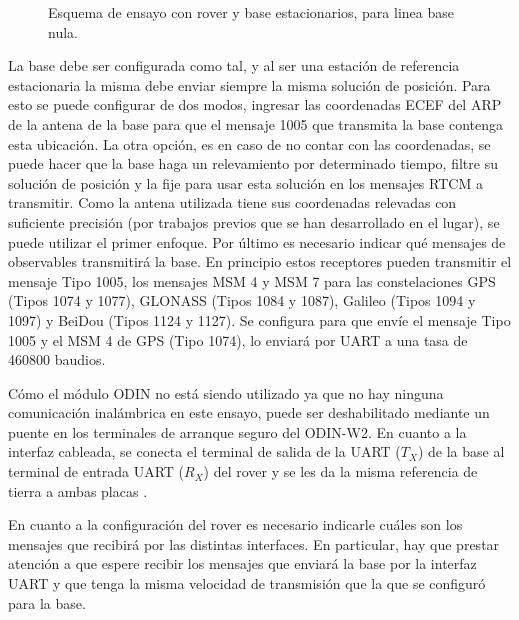 \documentclass[a4paper,12pt,oneside,onecolumn,final,openright]{book}%
\begin{document}
\begin{figure}
\centering
{}
\centering
{}
\caption{Esquema de ensayo con rover y base estacionarios, para linea base nula.}
\label{fig:EnsayoZBL}
\end{figure}

	La base debe ser configurada como tal, y al ser una estación de referencia estacionaria la misma debe enviar siempre la misma solución de posición. Para esto se puede configurar de dos modos, ingresar las coordenadas ECEF del ARP de la antena de la base para que el mensaje 1005 que transmita la base contenga esta ubicación. La otra opción, es en caso de no contar con las coordenadas, se puede hacer que la base haga un relevamiento por determinado tiempo, filtre su solución de posición y la fije para usar esta solución en los mensajes RTCM a transmitir. Como la antena utilizada tiene sus coordenadas relevadas con suficiente precisión (por trabajos previos que se han desarrollado en el lugar), se puede utilizar el primer enfoque. Por último es necesario indicar qué mensajes de observables transmitirá la base. En principio estos receptores pueden transmitir el mensaje Tipo 1005, los mensajes MSM 4 y MSM 7 para las constelaciones GPS (Tipos 1074 y 1077), GLONASS (Tipos 1084 y 1087), Galileo (Tipos 1094 y 1097) y BeiDou (Tipos 1124 y 1127). Se configura para que envíe el mensaje Tipo 1005 y el MSM 4 de GPS (Tipo 1074), lo enviará por UART a una tasa de 460800 baudios.
	
	Cómo el módulo ODIN no está siendo utilizado ya que no hay ninguna comunicación inalámbrica en este ensayo, puede ser deshabilitado mediante un puente en los terminales de arranque seguro del ODIN-W2. En cuanto a la interfaz cableada, se conecta el terminal de salida de la UART ($T_X$) de la base al terminal de entrada UART ($R_X$) del rover y se les da la misma referencia de tierra a ambas placas \cite{moving_base_AppN}.
	
	En cuanto a la configuración del rover es necesario indicarle cuáles son los mensajes que recibirá por las distintas interfaces. En particular, hay que prestar atención a que espere recibir los mensajes que enviará la base por la interfaz UART y que tenga la misma velocidad de transmisión que la que se configuró para la base.
\end{document}
